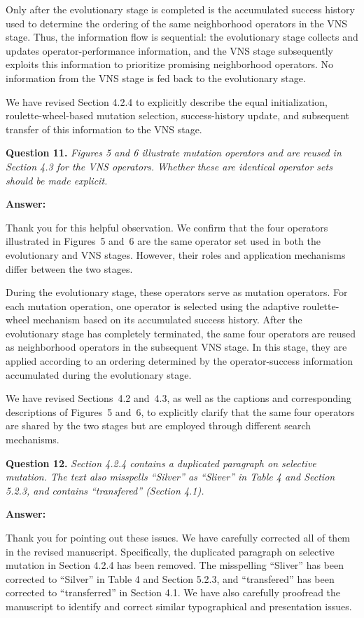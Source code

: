 \documentclass[11pt]{article}
\newcommand{\question}[2]{\vspace{0.5em}\noindent\textbf{Question #1.} \emph{#2}\par}
\newcommand{\answer}{\noindent\textbf{Answer:}\par}
\begin{document}
Only after the evolutionary stage is completed is the accumulated success history used to determine the ordering of the same neighborhood operators in the VNS stage. Thus, the information flow is sequential: the evolutionary stage collects and updates operator-performance information, and the VNS stage subsequently exploits this information to prioritize promising neighborhood operators. No information from the VNS stage is fed back to the evolutionary stage.

We have revised Section 4.2.4 to explicitly describe the equal initialization, roulette-wheel-based mutation selection, success-history update, and subsequent transfer of this information to the VNS stage.

\question{11}{Figures 5 and 6 illustrate mutation operators and are reused in Section 4.3 for the VNS operators. Whether these are identical operator sets should be made explicit.}
\answer
Thank you for this helpful observation. We confirm that the four operators illustrated in Figures~5 and~6 are the same operator set used in both the evolutionary and VNS stages. However, their roles and application mechanisms differ between the two stages.

During the evolutionary stage, these operators serve as mutation operators. For each mutation operation, one operator is selected using the adaptive roulette-wheel mechanism based on its accumulated success history. After the evolutionary stage has completely terminated, the same four operators are reused as neighborhood operators in the subsequent VNS stage. In this stage, they are applied according to an ordering determined by the operator-success information accumulated during the evolutionary stage.

We have revised Sections~4.2 and~4.3, as well as the captions and corresponding descriptions of Figures~5 and~6, to explicitly clarify that the same four operators are shared by the two stages but are employed through different search mechanisms.

\question{12}{Section 4.2.4 contains a duplicated paragraph on selective mutation. The text also misspells ``Silver'' as ``Sliver'' in Table 4 and Section 5.2.3, and contains ``transfered'' (Section 4.1).}
\answer
Thank you for pointing out these issues. We have carefully corrected all of them in the revised manuscript. Specifically, the duplicated paragraph on selective mutation in Section 4.2.4 has been removed. The misspelling ``Sliver'' has been corrected to ``Silver'' in Table 4 and Section 5.2.3, and ``transfered'' has been corrected to ``transferred'' in Section 4.1. We have also carefully proofread the manuscript to identify and correct similar typographical and presentation issues.
\end{document}
